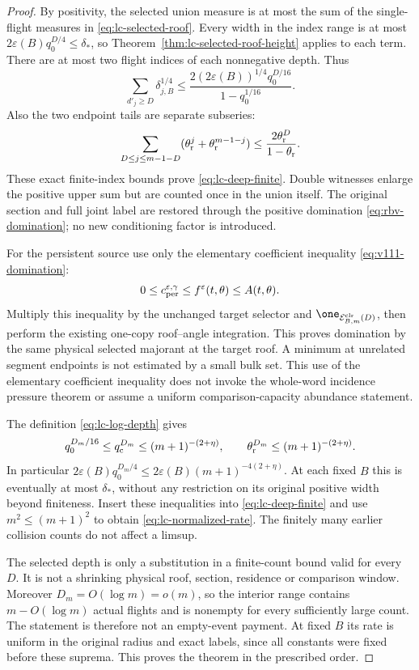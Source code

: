 \begin{proof}
By positivity, the selected union measure is at most the sum of the
single-flight measures in \eqref{eq:lc-selected-roof}.  Every width
in the index range is at most
$2\varepsilon(B)q_0^{D/4}\le\delta_*$, so
Theorem~\ref{thm:lc-selected-roof-height} applies to each term.
There are at most two flight indices of each nonnegative depth.  Thus
\[
 \sum_{d'_j\ge D}\delta_{j,B}^{1/4}
 \le\frac{2(2\varepsilon(B))^{1/4}q_0^{D/16}}
                                                {1-q_0^{1/16}}.
\]
Also the two endpoint tails are separate subseries:
\[
 \sum_{D\le j\le m-1-D}
       (\theta_{\rm r}^j+\theta_{\rm r}^{m-1-j})
                  \le\frac{2\theta_{\rm r}^D}{1-\theta_{\rm r}}.
\]
These exact finite-index bounds prove \eqref{eq:lc-deep-finite}.
Double witnesses enlarge the positive upper sum but are counted once
in the union itself.  The original section and full joint label are
restored through the positive domination
\eqref{eq:rbv-domination}; no new conditioning factor is introduced.

For the persistent source use only the elementary coefficient
inequality \eqref{eq:v111-domination}:
\[
       0\le c_{\rm per}^{\varepsilon,\gamma}
                         \le f^\varepsilon(t,\theta)\le A(t,\theta).
\]
Multiply this inequality by the unchanged target selector and
$\one_{\mathcal E^{\rm clr}_{B,m}(D)}$, then perform the existing
one-copy roof--angle integration.  This proves domination by the
same physical selected majorant at the target roof.  A minimum at
unrelated segment endpoints is not estimated by a small bulk set.
This use of the elementary coefficient inequality does not invoke
the whole-word incidence pressure theorem or assume a uniform
comparison-capacity abundance statement.

The definition \eqref{eq:lc-log-depth} gives
\[
 q_0^{D_m/16}\le q_{\rm c}^{D_m}
          \le(m+1)^{-(2+\eta)},\qquad
 \theta_{\rm r}^{D_m}\le(m+1)^{-(2+\eta)}.
\]
In particular
$2\varepsilon(B)q_0^{D_m/4}
 \le2\varepsilon(B)(m+1)^{-4(2+\eta)}$.
At each fixed $B$ this is eventually at most $\delta_*$, without
any restriction on its original positive width beyond finiteness.
Insert these inequalities into \eqref{eq:lc-deep-finite} and use
$m^2\le(m+1)^2$ to obtain \eqref{eq:lc-normalized-rate}.
The finitely many earlier collision counts do not affect a limsup.

The selected depth is only a substitution in a finite-count bound
valid for every $D$.  It is not a shrinking physical roof, section,
residence or comparison window.  Moreover $D_m=O(\log m)=o(m)$,
so the interior range contains $m-O(\log m)$ actual flights and
is nonempty for every sufficiently large count.  The statement is
therefore not an empty-event payment.  At fixed $B$ its rate is
uniform in the original radius and exact labels, since all constants
were fixed before these suprema.  This proves the theorem in the
prescribed order.
\end{proof}

